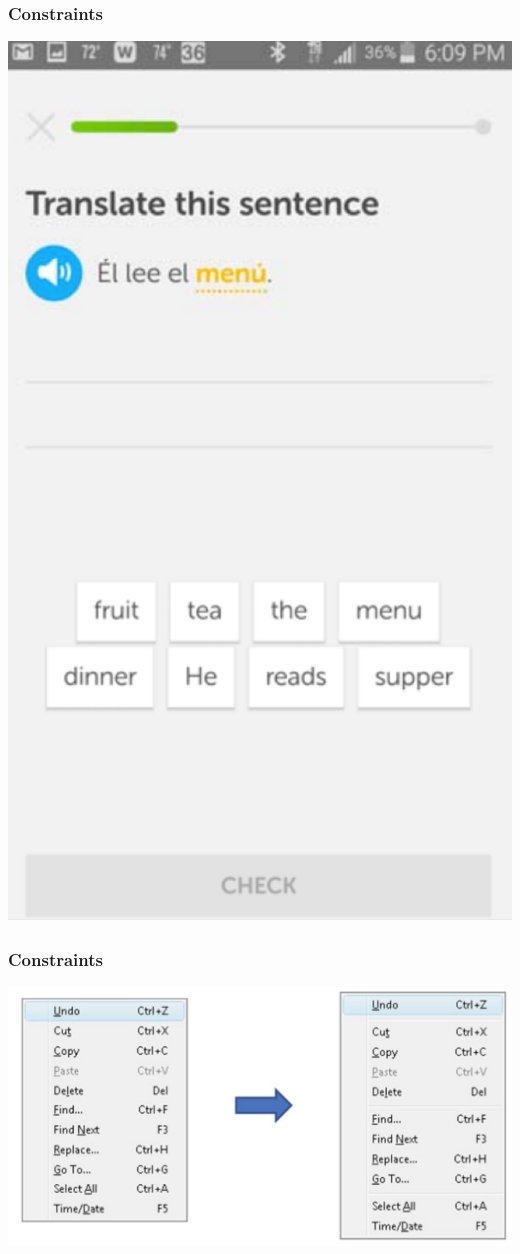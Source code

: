 \documentclass{beamer}
\begin{document}
\begin{frame}
\frametitle{Constraints}
\centering
\includegraphics[width=0.3\linewidth]{constraint3}
\end{frame}

\begin{frame}
\frametitle{Constraints}
\centering
\includegraphics[width=0.7\linewidth]{constraint4}
\end{frame}

%
\end{document}
